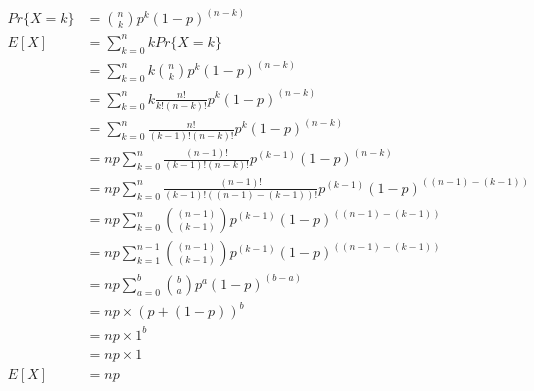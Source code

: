 \documentclass{article}
\begin{document}
	\begin{align}
	Pr\{X = k\} & = {n \choose k} p^k (1 - p)^{(n - k)} \\
	E[X] & = \sum_{k = 0}^{n} k Pr\{X = k\} \\
	& = \sum_{k = 0}^{n} k {n \choose k} p^k (1 - p)^{(n - k)} \\
	& = \sum_{k = 0}^{n} k \frac{n!}{k!(n - k)!} p^k (1 - p)^{(n - k)} \\
	& = \sum_{k = 0}^{n} \frac{n!}{(k - 1)!(n - k)!} p^k (1 - p)^{(n - k)} \\
	& = np \sum_{k = 0}^{n} \frac{(n - 1)!}{(k - 1)!(n - k)!} p^{(k - 1)} (1 - p)^{(n - k)} \\
	& = np \sum_{k = 0}^{n} \frac{(n - 1)!}{(k - 1)!((n - 1) - (k - 1))!} p^{(k - 1)} (1 - p)^{((n - 1) - (k - 1))} \\
	& = np \sum_{k = 0}^{n} {(n - 1) \choose (k - 1)} p^{(k - 1)} (1 - p)^{((n - 1) - (k - 1))} \\
	& = np \sum_{k = 1}^{n - 1} {(n - 1) \choose (k - 1)} p^{(k - 1)} (1 - p)^{((n - 1) - (k - 1))} \\
	& = np \sum_{a = 0}^{b} {b \choose a} p^{a} (1 - p)^{(b - a)} \\
	& = np \times (p + (1 - p))^b \\ 
	& = np \times 1^b \\
	& = np \times 1 \\
	E[X] & = np
	\end{align}
\end{document}
